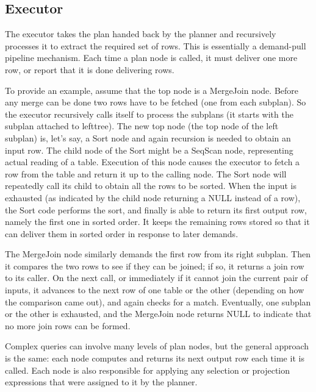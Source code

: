 \subsection{Executor}
{\justify
The executor \cite{PostgreSQL internals} takes the plan handed back by the planner and recursively processes it to extract the required set of rows. This is essentially a demand-pull pipeline mechanism. Each time a plan node is called, it must deliver one more row, or report that it is done delivering rows.
\par }
\vspace{0.5cm}
{\justify
To provide an example, assume that the top node is a MergeJoin node. Before any merge can be done two rows have to be fetched (one from each subplan). So the executor recursively calls itself to process the subplans (it starts with the subplan attached to lefttree). The new top node (the top node of the left subplan) is, let's say, a Sort node and again recursion is needed to obtain an input row. The child node of the Sort might be a SeqScan node, representing actual reading of a table. Execution of this node causes the executor to fetch a row from the table and return it up to the calling node. The Sort node will repeatedly call its child to obtain all the rows to be sorted. When the input is exhausted (as indicated by the child node returning a NULL instead of a row), the Sort code performs the sort, and finally is able to return its first output row, namely the first one in sorted order. It keeps the remaining rows stored so that it can deliver them in sorted order in response to later demands.
\par}
\vspace{0.5cm}
{\justify
The MergeJoin node similarly demands the first row from its right subplan. Then it compares the two rows to see if they can be joined; if so, it returns a join row to its caller. On the next call, or immediately if it cannot join the current pair of inputs, it advances to the next row of one table or the other (depending on how the comparison came out), and again checks for a match. Eventually, one subplan or the other is exhausted, and the MergeJoin node returns NULL to indicate that no more join rows can be formed.
\par }
\vspace{0.5cm}
{\justify
Complex queries can involve many levels of plan nodes, but the general approach is the same: each node computes and returns its next output row each time it is called. Each node is also responsible for applying any selection or projection expressions that were assigned to it by the planner.
\par }
\vspace{0.5cm}
